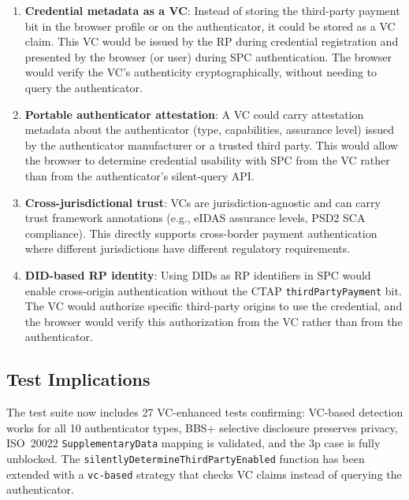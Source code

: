 \documentclass[12pt,a4paper]{article}
\begin{document}
\begin{enumerate}[noitemsep,topsep=4pt]
  \item \textbf{Credential metadata as a VC}: Instead of storing the third-party payment bit in the browser profile or on the authenticator, it could be stored as a VC claim. This VC would be issued by the RP during credential registration and presented by the browser (or user) during SPC authentication. The browser would verify the VC's authenticity cryptographically, without needing to query the authenticator.

  \item \textbf{Portable authenticator attestation}: A VC could carry attestation metadata about the authenticator (type, capabilities, assurance level) issued by the authenticator manufacturer or a trusted third party. This would allow the browser to determine credential usability with SPC from the VC rather than from the authenticator's silent-query API.

  \item \textbf{Cross-jurisdictional trust}: VCs are jurisdiction-agnostic and can carry trust framework annotations (e.g., eIDAS assurance levels, PSD2 SCA compliance). This directly supports cross-border payment authentication where different jurisdictions have different regulatory requirements.

  \item \textbf{DID-based RP identity}: Using DIDs as RP identifiers in SPC would enable cross-origin authentication without the CTAP \texttt{thirdPartyPayment} bit. The VC would authorize specific third-party origins to use the credential, and the browser would verify this authorization from the VC rather than from the authenticator.
\end{enumerate}

\subsection{Test Implications}

The test suite now includes 27 VC-enhanced tests confirming: VC-based detection works for all 10 authenticator types, BBS+ selective disclosure preserves privacy, ISO~20022 \texttt{SupplementaryData} mapping is validated, and the 3p case is fully unblocked. The \texttt{silentlyDetermineThirdPartyEnabled} function has been extended with a \texttt{vc-based} strategy that checks VC claims instead of querying the authenticator.

\newpage
\end{document}
